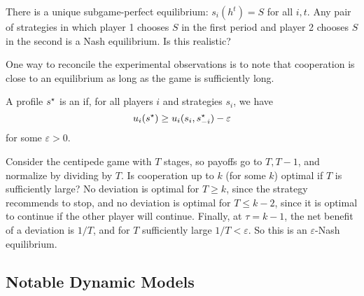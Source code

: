 \documentclass[10pt]{article}
\begin{document}
\begin{example}
\begin{figure}[H]
	\end{figure} 
	There is a unique subgame-perfect equilibrium: $s_i(h^t) = S$ for all $i,t$. Any pair of strategies in which player 1 chooses $S$ in the first period and player 2 chooses $S$ in the second is a Nash equilibrium. Is this realistic? 
\end{example}
\begin{remark}
	One way to reconcile the experimental observations is to note that cooperation is close to an equilibrium as long as the game is sufficiently long.
\end{remark}
\begin{definition}
	A profile $s^\star$ is an  if, for all players $i$ and strategies $s_i$, we have \[u_i(s^\star) \ge u_i(s_i,s_{-i}^\star) - \varepsilon\]for some $\varepsilon > 0$. 
\end{definition}

\begin{example}
	Consider the centipede game with $T$ stages, so payoffs go to $T, T-1$, and normalize by dividing by $T$. Is cooperation up to $k$ (for some $k$) optimal if $T$ is sufficiently large? No deviation is optimal for $T \ge k$, since the strategy recommends to stop, and no deviation is optimal for $T \le k-2$, since it is optimal to continue if the other player will continue. Finally, at $\tau = k-1$, the net benefit of a deviation is $1/T$, and for $T$ sufficiently large $1/T < \varepsilon$. So this is an $\varepsilon$-Nash equilibrium. 
\end{example}

\subsection{Notable Dynamic Models}
\end{document}
